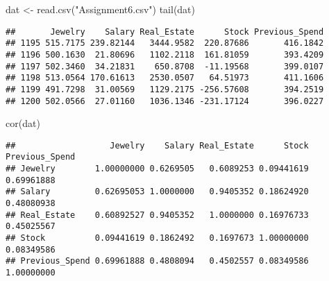 \documentclass[
]{article}
\newenvironment{Shaded}{\begin{snugshade}}{\end{snugshade}}
\newcommand{\CommentTok}[1]{\textcolor[rgb]{0.56,0.35,0.01}{\textit{#1}}}
\newcommand{\FunctionTok}[1]{\textcolor[rgb]{0.00,0.00,0.00}{#1}}
\newcommand{\NormalTok}[1]{#1}
\newcommand{\OtherTok}[1]{\textcolor[rgb]{0.56,0.35,0.01}{#1}}
\newcommand{\StringTok}[1]{\textcolor[rgb]{0.31,0.60,0.02}{#1}}
\begin{document}
\begin{Shaded}
\begin{Highlighting}[]
\NormalTok{dat }\OtherTok{\textless{}{-}} \FunctionTok{read.csv}\NormalTok{(}\StringTok{"Assignment6.csv"}\NormalTok{)}
\FunctionTok{tail}\NormalTok{(dat)}
\end{Highlighting}
\end{Shaded}

\begin{verbatim}
##       Jewelry    Salary Real_Estate      Stock Previous_Spend
## 1195 515.7175 239.82144   3444.9582  220.87686       416.1842
## 1196 500.1630  21.80696   1102.2118  161.81059       393.4209
## 1197 502.3460  34.21831    650.8708  -11.19568       399.0107
## 1198 513.0564 170.61613   2530.0507   64.51973       411.1606
## 1199 491.7298  31.00569   1129.2175 -256.57608       394.2519
## 1200 502.0566  27.01160   1036.1346 -231.17124       396.0227
\end{verbatim}

\begin{Shaded}
\end{Shaded}

\begin{Shaded}
\begin{Highlighting}[]
\FunctionTok{cor}\NormalTok{(dat)}
\end{Highlighting}
\end{Shaded}

\begin{verbatim}
##                   Jewelry    Salary Real_Estate      Stock Previous_Spend
## Jewelry        1.00000000 0.6269505   0.6089253 0.09441619     0.69961888
## Salary         0.62695053 1.0000000   0.9405352 0.18624920     0.48080938
## Real_Estate    0.60892527 0.9405352   1.0000000 0.16976733     0.45025567
## Stock          0.09441619 0.1862492   0.1697673 1.00000000     0.08349586
## Previous_Spend 0.69961888 0.4808094   0.4502557 0.08349586     1.00000000
\end{verbatim}
\end{document}
